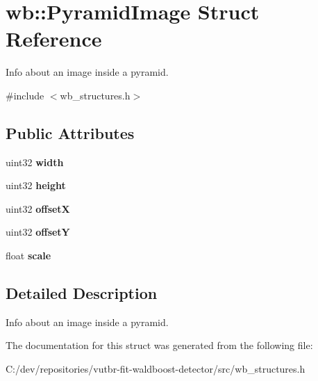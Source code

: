 \hypertarget{structwb_1_1_pyramid_image}{}\section{wb\+:\+:Pyramid\+Image Struct Reference}
\label{structwb_1_1_pyramid_image}


Info about an image inside a pyramid.  




{\ttfamily \#include $<$wb\+\_\+structures.\+h$>$}

\subsection*{Public Attributes}
\begin{DoxyCompactItemize}
\item 
\hypertarget{structwb_1_1_pyramid_image_af0e05eff866b26606b4a08720a8811a2}{}uint32 {\bfseries width}\label{structwb_1_1_pyramid_image_af0e05eff866b26606b4a08720a8811a2}

\item 
\hypertarget{structwb_1_1_pyramid_image_a8803f11eb1a05cc1d5ee3e57a051b1b3}{}uint32 {\bfseries height}\label{structwb_1_1_pyramid_image_a8803f11eb1a05cc1d5ee3e57a051b1b3}

\item 
\hypertarget{structwb_1_1_pyramid_image_a5a4c86dab53bda06779daa9c6fa6728e}{}uint32 {\bfseries offset\+X}\label{structwb_1_1_pyramid_image_a5a4c86dab53bda06779daa9c6fa6728e}

\item 
\hypertarget{structwb_1_1_pyramid_image_a952bf6399f48810e45a9b5d683f2b97d}{}uint32 {\bfseries offset\+Y}\label{structwb_1_1_pyramid_image_a952bf6399f48810e45a9b5d683f2b97d}

\item 
\hypertarget{structwb_1_1_pyramid_image_a68f451c9b1e09372b8daf2cf2b2f304c}{}float {\bfseries scale}\label{structwb_1_1_pyramid_image_a68f451c9b1e09372b8daf2cf2b2f304c}

\end{DoxyCompactItemize}


\subsection{Detailed Description}
Info about an image inside a pyramid. 

The documentation for this struct was generated from the following file\+:\begin{DoxyCompactItemize}
\item 
C\+:/dev/repositories/vutbr-\/fit-\/waldboost-\/detector/src/wb\+\_\+structures.\+h\end{DoxyCompactItemize}
